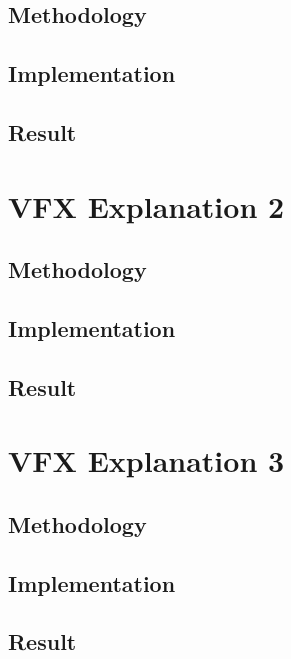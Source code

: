 \documentclass[sigconf]{acmart}
\begin{document}
\subsection{Methodology}
\lipsum[2]
\subsection{Implementation}
\lipsum[5-7]
\subsection{Result}
\lipsum[9]

\section{VFX Explanation 2}

\subsection{Methodology}
\lipsum[2]
\subsection{Implementation}
\lipsum[5-7]
\subsection{Result}
\lipsum[9]

\section{VFX Explanation 3}

\subsection{Methodology}
\lipsum[2]
\subsection{Implementation}
\lipsum[5-7]
\subsection{Result}
\lipsum[9]


\begin{acks}
	\lipsum[3]
\end{acks}




\appendix
\lipsum
\end{document}
